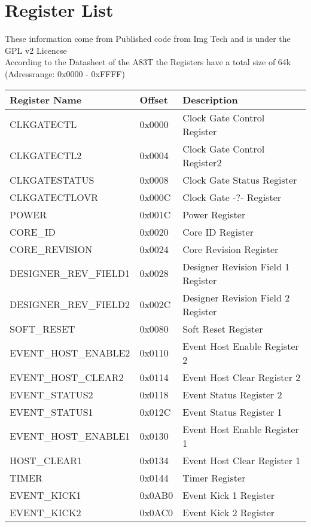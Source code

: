 \chapter{Register List}\label{chp:reglist}

These information come from Published code from Img Tech and is under the GPL v2 Licencse\\
According to the Datasheet of the A83T the Registers have a total size of 64k (Adressrange: 0x0000 - 0xFFFF)

\begin{longtable}[c]{|m{}|C{0.10\textwidth}|m{0.42\textwidth}|} \hline
	Register Name & Offset & Description \\ \hline
	CLKGATECTL & 0x0000 & Clock Gate Control Register \\ \hline
	CLKGATECTL2 & 0x0004 & Clock Gate Control Register2 \\ \hline
	CLKGATESTATUS & 0x0008 & Clock Gate Status Register \\ \hline
	CLKGATECTLOVR & 0x000C & Clock Gate -?- Register \\ \hline
	POWER  & 0x001C & Power Register \\ \hline
	CORE\_ID & 0x0020 & Core ID Register \\ \hline
	CORE\_REVISION & 0x0024 & Core Revision Register\\ \hline
	DESIGNER\_REV\_FIELD1 & 0x0028 & Designer Revision Field 1 Register \\ \hline
	DESIGNER\_REV\_FIELD2 & 0x002C & Designer Revision Field 2 Register \\ \hline
	SOFT\_RESET & 0x0080 & Soft Reset Register \\ \hline
	EVENT\_HOST\_ENABLE2 & 0x0110 & Event Host Enable Register 2 \\ \hline
	EVENT\_HOST\_CLEAR2 & 0x0114 & Event Host Clear Register 2 \\ \hline
	EVENT\_STATUS2 & 0x0118 & Event Status Register 2 \\ \hline
	EVENT\_STATUS1 & 0x012C & Event Status Register 1 \\ \hline
	EVENT\_HOST\_ENABLE1 & 0x0130 & Event Host Enable Register 1 \\ \hline
	HOST\_CLEAR1 & 0x0134  & Event Host Clear Register 1 \\ \hline
	TIMER & 0x0144 & Timer Register \\ \hline
	EVENT\_KICK1 & 0x0AB0 & Event Kick 1 Register \\ \hline
	EVENT\_KICK2 & 0x0AC0 & Event Kick 2 Register\\ \hline

\end{longtable}
